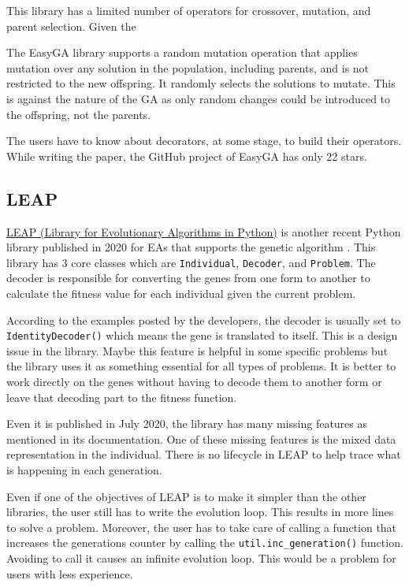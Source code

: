 \documentclass[conference]{IEEEtran}
\begin{document}
This library has a limited number of operators for crossover, mutation, and parent selection. Given the 

The EasyGA library supports a random mutation operation that applies mutation over any solution in the population, including parents, and is not restricted to the new offspring. It randomly selects the solutions to mutate. This is against the nature of the GA as only random changes could be introduced to the offspring, not the parents.

The users have to know about decorators, at some stage, to build their operators. While writing the paper, the GitHub project of EasyGA has only 22 stars.

\subsection{LEAP}
\label{leap}
\href{https://leap-gmu.readthedocs.io/en/latest}{LEAP (Library for Evolutionary Algorithms in Python)} is another recent Python library published in 2020 for EAs that supports the genetic algorithm \cite{LEAP}. This library has 3 core classes which are \texttt{Individual}, \texttt{Decoder}, and \texttt{Problem}. The decoder is responsible for converting the genes from one form to another to calculate the fitness value for each individual given the current problem. 

According to the examples posted by the developers, the decoder is usually set to \texttt{IdentityDecoder()} which means the gene is translated to itself. This is a design issue in the library. Maybe this feature is helpful in some specific problems but the library uses it as something essential for all types of problems.  It is better to work directly on the genes without having to decode them to another form or leave that decoding part to the fitness function. 

Even it is published in July 2020, the library has many missing features as mentioned in its documentation. One of these missing features is the mixed data representation in the individual. There is no lifecycle in LEAP to help trace what is happening in each generation.

Even if one of the objectives of LEAP is to make it simpler than the other libraries, the user still has to write the evolution loop. This results in more lines to solve a problem. Moreover, the user has to take care of calling a function that increases the generations counter by calling the \texttt{util.inc\_generation()} function. Avoiding to call it causes an infinite evolution loop. This would be a problem for users with less experience. 
\end{document}
